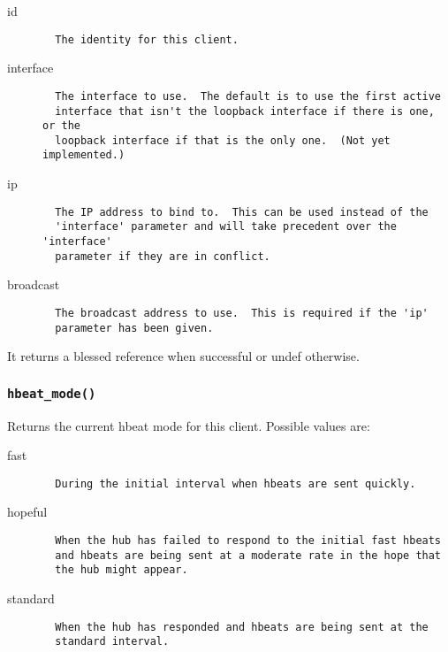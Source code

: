 \documentclass[12pt,a4paper]{article}
\begin{document}
\begin{description}

\item[{id}] \mbox{}\begin{verbatim}
  The identity for this client.
\end{verbatim}

\item[{interface}] \mbox{}\begin{verbatim}
  The interface to use.  The default is to use the first active
  interface that isn't the loopback interface if there is one, or the
  loopback interface if that is the only one.  (Not yet implemented.)
\end{verbatim}

\item[{ip}] \mbox{}\begin{verbatim}
  The IP address to bind to.  This can be used instead of the
  'interface' parameter and will take precedent over the 'interface'
  parameter if they are in conflict.
\end{verbatim}

\item[{broadcast}] \mbox{}\begin{verbatim}
  The broadcast address to use.  This is required if the 'ip'
  parameter has been given.
\end{verbatim}
\end{description}


It returns a blessed reference when successful or undef otherwise.

\subsubsection*{\texttt{hbeat\_mode()}\label{xPL::Client_hbeat_mode_}}


Returns the current hbeat mode for this client.  Possible values
are:

\begin{description}

\item[{fast}] \mbox{}\begin{verbatim}
  During the initial interval when hbeats are sent quickly.
\end{verbatim}

\item[{hopeful}] \mbox{}\begin{verbatim}
  When the hub has failed to respond to the initial fast hbeats
  and hbeats are being sent at a moderate rate in the hope that
  the hub might appear.
\end{verbatim}

\item[{standard}] \mbox{}\begin{verbatim}
  When the hub has responded and hbeats are being sent at the
  standard interval.
\end{verbatim}
\end{description}
\end{document}
